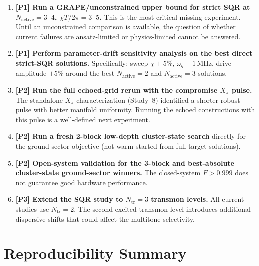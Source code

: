 \documentclass[11pt,letterpaper]{article}
\newcommand{\chiT}{\chi T / 2\pi}
\newcommand{\nact}{N_{\text{active}}}
\begin{document}
\begin{enumerate}
\item \textbf{[P1] Run a GRAPE/unconstrained upper bound for strict SQR at
  $\nact = 3$--$4$, $\chiT = 3$--$5$.}
  This is the most critical missing experiment.
  Until an unconstrained comparison is available, the question of whether current
  failures are ansatz-limited or physics-limited cannot be answered.

\item \textbf{[P1] Perform parameter-drift sensitivity analysis on the best
  direct strict-SQR solutions.}
  Specifically: sweep $\chi \pm 5\%$, $\omega_q \pm 1$\,MHz, drive amplitude
  $\pm 5\%$ around the best $\nact = 2$ and $\nact = 3$ solutions.

\item \textbf{[P2] Run the full echoed-grid rerun with the compromise $X_\pi$ pulse.}
  The standalone $X_\pi$ characterization (Study~8) identified a shorter robust
  pulse with better manifold uniformity.  Running the echoed constructions with
  this pulse is a well-defined next experiment.

\item \textbf{[P2] Run a fresh 2-block low-depth cluster-state search}
  directly for the ground-sector objective (not warm-started from full-target solutions).

\item \textbf{[P2] Open-system validation for the 3-block and best-absolute
  cluster-state ground-sector winners.}
  The closed-system $F > 0.999$ does not guarantee good hardware performance.

\item \textbf{[P3] Extend the SQR study to $N_\text{tr} = 3$ transmon levels.}
  All current studies use $N_\text{tr} = 2$.  The second excited transmon level
  introduces additional dispersive shifts that could affect the multitone selectivity.
\end{enumerate}

\section{Reproducibility Summary}
\end{document}
